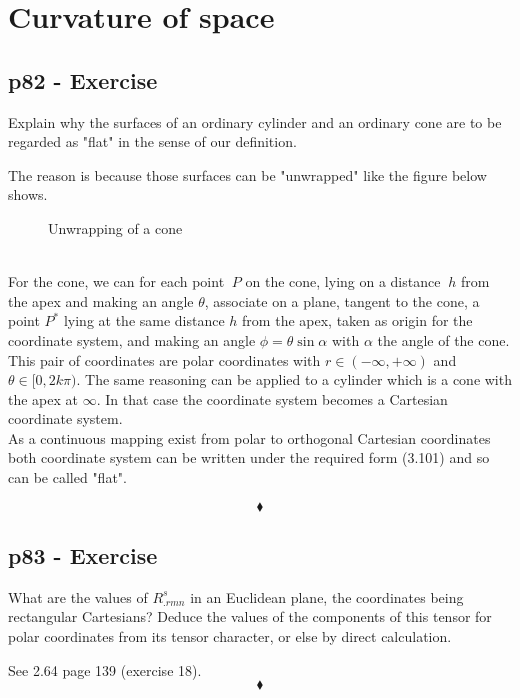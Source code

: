 \chapter{Curvature of space}
\pagebreak[4]
\section{p82 - Exercise}
\begin{tcolorbox}
Explain why the surfaces of an ordinary cylinder and an ordinary cone are to be regarded as "flat" in the sense of our definition.
\end{tcolorbox}
The reason is because those surfaces can be "unwrapped" like the figure below shows. 
\begin{figure}[h]


\caption{Unwrapping of a cone}
\end{figure}\\
For the cone, we can for each point $\ P $ on the cone, lying on a distance $\ h $ from the apex and making an angle $\theta $,  associate on a plane, tangent to the cone,  a  point $ P^* $ lying at the same  distance $ h $ from the apex, taken as origin for the coordinate system, and making an angle $\phi =  \theta \sin{\alpha} $ with $ \alpha $ the angle of the cone. This pair of coordinates are polar coordinates with $ r \in (-\infty, + \infty)$ and $\theta \in [0, 2k\pi)$. 
The same reasoning can be applied to a cylinder which is a cone with the apex at $\infty$. In that case the coordinate system becomes a Cartesian coordinate system. \\
As a continuous mapping exist from polar to orthogonal Cartesian coordinates both  coordinate system can be written under the required form (3.101) and so can be called "flat".

$$\blacklozenge$$
\newpage

\section{p83 - Exercise}
\begin{tcolorbox}
What are the values of $R^s_{.rmn}$ in an Euclidean plane, the coordinates being rectangular Cartesians? Deduce the values of the components of this tensor for polar coordinates from its tensor character, or else by direct calculation.
\end{tcolorbox}
See 2.64 page 139 (exercise 18).
$$\blacklozenge$$
\newpage

